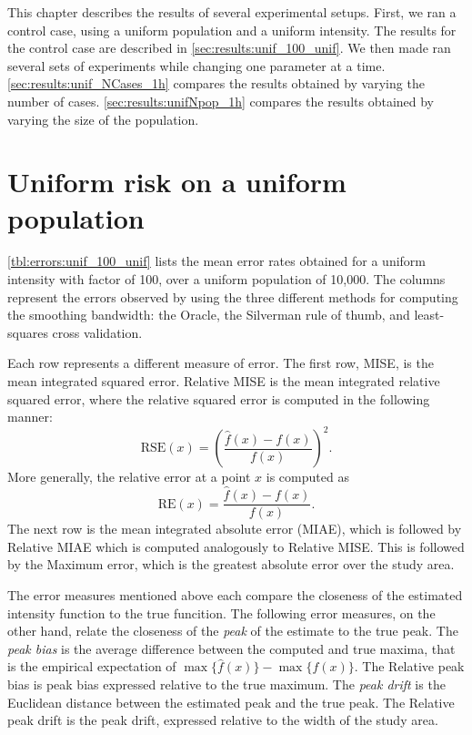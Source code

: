 

This chapter describes the results of several experimental setups.
First, we ran a control case, using a uniform population and a uniform intensity.
The results for the control case are described in \autoref{sec:results:unif_100_unif}.
We then made ran several sets of experiments while changing one parameter at a time.
\autoref{sec:results:unif_NCases_1h} compares the results obtained by varying the number of cases.
\autoref{sec:results:unifNpop_1h} compares the results obtained by varying the size of the population.


\section{Uniform risk on a uniform population}
\label{sec:results:unif_100_unif}

\autoref{tbl:errors:unif_100_unif} lists the mean error rates obtained for a uniform intensity with factor of 100, over a uniform population of 10,000.
The columns represent the errors observed by using the three different methods for computing the smoothing bandwidth:
the Oracle, the Silverman rule of thumb, and least-squares cross validation.

Each row represents a different measure of error.
The first row, MISE, is the mean integrated squared error.
Relative MISE is the mean integrated relative squared error, where the relative squared error is computed in the following manner:
\[ \mbox{RSE}(x) = \left(\frac{\hat{f}(x)-f(x)}{f(x)}\right)^2 .\]
More generally, the relative error at a point \(x\) is computed as
\[ \mbox{RE}(x) =  \frac{\hat{f}(x)-f(x)}{f(x)} .\]
The next row is the mean integrated absolute error (MIAE), which is followed by Relative MIAE which is computed analogously to Relative MISE.
This is followed by the Maximum error, which is the greatest absolute error over the study area.

The error measures mentioned above each compare the closeness of the estimated intensity function to the true funcition.
The following error measures, on the other hand, relate the closeness of the \textit{peak} of the estimate to the true peak.
The \textit{peak bias} is the average difference between the computed and true maxima,
that is the empirical expectation of \(\max{\{\hat{f}(x)\}} - \max{\{f(x)\}}\).
The Relative peak bias is peak bias expressed relative to the true maximum.
The \textit{peak drift} is the Euclidean distance between the estimated peak and the true peak.
The Relative peak drift is the peak drift, expressed relative to the width of the study area.

